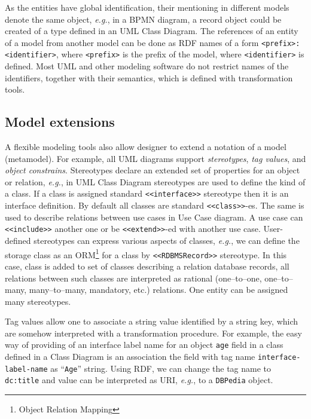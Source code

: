 \documentclass[conference]{IEEEtran} \IEEEoverridecommandlockouts
\begin{document}
As the entities have global identification, their mentioning in different models denote the same object, \emph{e.g.}, in a BPMN diagram, a record object could be created of a type defined in an UML Class Diagram. The references of an entity of a model from another model can be done as RDF names of a form \texttt{<prefix>:<identifier>}, where \texttt{<prefix>} is the prefix of the model, where \texttt{<identifier>} is defined. Most UML and other modeling software do not restrict names of the identifiers, together with their semantics, which is defined with transformation tools. 

\subsection{Model extensions} \label{sec:mod-ext} 

A flexible modeling tools also allow designer to extend a notation of a model (metamodel). For example, all UML diagrams support \emph{stereotypes}, \emph{tag values}, and \emph{object constrains}. Stereotypes declare an extended set of properties for an object or relation, \emph{e.g.}, in UML Class Diagram stereotypes are used to define the kind of a class. If a class is assigned standard \texttt{<<interface>>} stereotype then it is an interface definition. By default all classes are standard \texttt{<<class>>}-es. The same is used to describe relations between use cases in Use Case diagram. A use case can \texttt{<<include>>} another one or be \texttt{<<extend>>}-ed with another use case. User-defined stereotypes can express various aspects of classes, \emph{e.g.}, we can define the storage class as an ORM\footnote{Object Relation Mapping} for a class by \texttt{<<RDBMSRecord>>} stereotype. In this case, class is added to set of classes describing a relation database records, all relations between such classes are interpreted as rational (one--to--one, one--to--many, many--to--many, mandatory, etc.) relations. One entity can be assigned many stereotypes. 

Tag values allow one to associate a string value identified by a string key, which are somehow interpreted with a transformation procedure. For example, the easy way of providing of an interface label name for an object \texttt{age} field in a class defined in a Class Diagram is an association the field with tag name \texttt{interface-label-name} as ``\texttt{Age}'' string. Using RDF, we can change the tag name to \texttt{dc:title} and value can be interpreted as URI, \emph{e.g.}, to a \texttt{DBPedia} object. 
\end{document}
